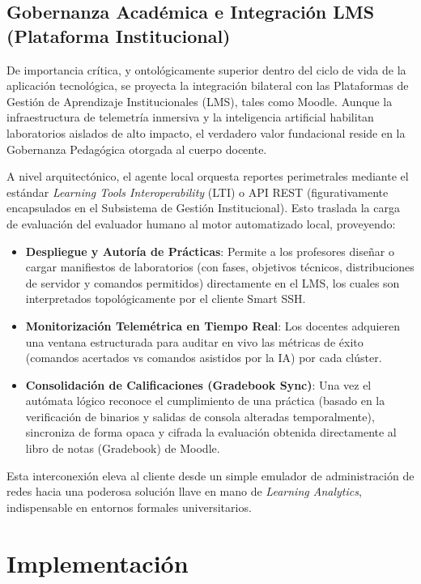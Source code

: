 \documentclass[conference]{IEEEtran} %
\begin{document}
\subsection{Gobernanza Académica e Integración LMS (Plataforma Institucional)}

De importancia crítica, y ontológicamente superior dentro del ciclo de vida de la aplicación tecnológica, se proyecta la integración bilateral con las Plataformas de Gestión de Aprendizaje Institucionales (LMS), tales como Moodle. Aunque la infraestructura de telemetría inmersiva y la inteligencia artificial habilitan laboratorios aislados de alto impacto, el verdadero valor fundacional reside en la Gobernanza Pedagógica otorgada al cuerpo docente.

A nivel arquitectónico, el agente local orquesta reportes perimetrales mediante el estándar \textit{Learning Tools Interoperability} (LTI) o API REST (figurativamente encapsulados en el Subsistema de Gestión Institucional). Esto traslada la carga de evaluación del evaluador humano al motor automatizado local, proveyendo:
\begin{itemize}
    \item \textbf{Despliegue y Autoría de Prácticas}: Permite a los profesores diseñar o cargar manifiestos de laboratorios (con fases, objetivos técnicos, distribuciones de servidor y comandos permitidos) directamente en el LMS, los cuales son interpretados topológicamente por el cliente Smart SSH.
    \item \textbf{Monitorización Telemétrica en Tiempo Real}: Los docentes adquieren una ventana estructurada para auditar en vivo las métricas de éxito (comandos acertados vs comandos asistidos por la IA) por cada clúster.
    \item \textbf{Consolidación de Calificaciones (Gradebook Sync)}: Una vez el autómata lógico reconoce el cumplimiento de una práctica (basado en la verificación de binarios y salidas de consola alteradas temporalmente), sincroniza de forma opaca y cifrada la evaluación obtenida directamente al libro de notas (Gradebook) de Moodle.
\end{itemize}

Esta interconexión eleva al cliente desde un simple emulador de administración de redes hacia una poderosa solución llave en mano de \textit{Learning Analytics}, indispensable en entornos formales universitarios.

\section{Implementación}
\end{document}
